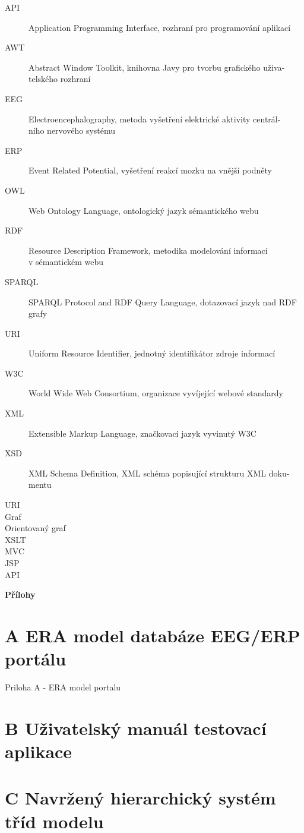 \documentclass{projekt}
\begin{document}
\noindent
\begin{description}
\item[API] Application Programming Interface, rozhraní pro programování aplikací
\item[AWT] Abstract Window Toolkit, knihovna Javy pro tvorbu grafického uživa-\\telského rozhraní
\item[EEG] Electroencephalography, metoda vyšetření elektrické aktivity centrál-\\ního nervového
systému
\item[ERP] Event Related Potential, vyšetření reakcí mozku na vnější podněty
\item[OWL] Web Ontology Language, ontologický jazyk sémantického webu
\item[RDF] Resource Description Framework, metodika modelování informací \\v sémantickém webu
\item[SPARQL] SPARQL Protocol and RDF Query Language, dotazovací jazyk nad RDF grafy
\item[URI] Uniform Resource Identifier, jednotný identifikátor zdroje informací
\item[W3C] World Wide Web Consortium, organizace vyvíjející webové standardy
\item[XML] Extensible Markup Language, značkovací jazyk vyvinutý W3C
\item[XSD] XML Schema Definition, XML schéma popisující strukturu XML doku-\\mentu

\item[URI]
\item[Graf]
\item[Orientovaný graf]
\item[XSLT]
\item[MVC]
\item[JSP]
\item[API]


\end{description}


\listoffigures





\appendix
\newpage


\thispagestyle{plain}

\noindent
{\bf \LARGE Přílohy}
\setcounter{chapter}{1}

\newpage
\thispagestyle{plain}
\section*{{\LARGE A} ERA model databáze EEG/ERP portálu}
\hspace{0.65cm}Priloha A - ERA model portalu
\section*{{\LARGE B} Uživatelský manuál testovací aplikace}
\section*{{\LARGE C} Navržený hierarchický systém tříd modelu}
\end{document}
